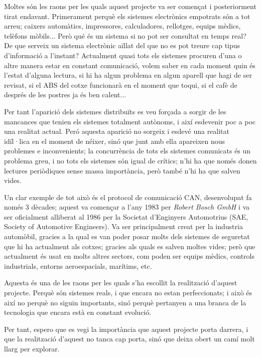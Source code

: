 Moltes són les raons per les quals aquest projecte va ser començat i posteriorment tirat endavant. Primerament perquè els sistemes electrònics empotrats són a tot arreu; caixers automàtics, impressores, calculadores, rellotges, equips mèdics, telèfons mòbils... Però qué és un sistema si no pot ser consultat en temps real? De que serveix un sistema electrònic aïllat del que no es pot treure cap tipus d'informació a l'instant? Actualment quasi tots els sistemes procuren d'una o altre manera estar en constant comunicació, volem saber en cada moment quin és l'estat d'alguna lectura, si hi ha algun problema en algun aparell que hagi de ser revisat, si el ABS del cotxe funcionarà en el moment que toqui, si el cafè de després de les postres ja és ben calent... 
 
Per tant l'aparició dels sistemes distribuïts es veu forçada a sorgir de les mancances que tenien els sistemes totalment autònoms, i així esdevenir poc a poc una realitat actual. Peró aquesta aparició no sorgeix i esdevé una realitat idíl·lica en el moment de néixer, sinó que junt amb ella apareixen nous problemes e inconvenients; la concurrència de tots els sistemes comunicats és un problema greu, i no tots els sistemes són igual de crítics; n'hi ha que només donen lectures periòdiques sense massa importància, però també n'hi ha que salven vides.

Un clar exemple de tot això és el protocol de comunicació CAN, desenvolupat fa només 3 dècades; aquest va començar a l'any 1983 per \emph{Robert Bosch GmbH} i va ser oficialment alliberat al 1986 per la Societat d'Enginyers Automotrius (SAE, Society of Automotive Engineers). Va ser principalment creat per la industria automòbil, gracies a la qual es van poder posar molts dels sistemes de seguretat que hi ha actualment als cotxes; gracies als quals es salven moltes vides; però que actualment és usat en molts altres sectors, com poden ser equips mèdics, controls industrials, entorns aeroespacials, marítims, etc.

Aquesta és una de les raons per les quals s'ha escollit la realització d'aquest projecte. Perquè són sistemes reals, i que encara no estan perfeccionats; i això és així no perquè no siguin importants, sinó perquè pertanyen a una branca de la tecnologia que encara està en constant evolució.

Per tant, espero que es vegi la importància que aquest projecte porta darrera, i que la realització d'aquest no tanca cap porta, sinó que deixa obert un camí molt llarg per explorar.


